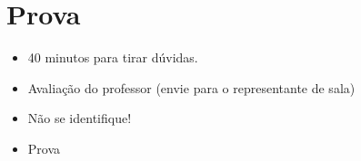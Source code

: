 \section{Prova}

\begin{frame}
	\begin{block}{}
		\begin{itemize}
			\item 40 minutos para tirar dúvidas.
			\item Avaliação do professor (envie para o representante de sala)
			\item Não se identifique!
			\item Prova
		\end{itemize}
	\end{block}
\end{frame}
